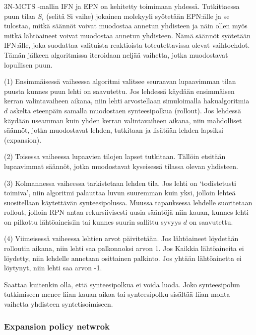 \documentclass[finnish,twoside,censored,tkt,sw-line]{HYthesisML}
\begin{document}
3N-MCTS -mallin IFN ja EPN on kehitetty toimimaan yhdessä.
Tutkittaessa puun tilaa \(S_i\) (selitä Si vaihe) jokainen molekyyli syötetään EPN:älle ja se tulostaa, mitkä säännöt voivat muodostaa annetun yhdisteen ja näin ollen myös mitkä lähtöaineet voivat muodostaa annetun yhdisteen.
Nämä säännöt syötetään IFN:älle, joka suodattaa valituista reaktioista toteutettavissa olevat vaihtoehdot.
Tämän jälkeen algoritmissa iteroidaan neljää vaihetta, jotka muodostavat lopullisen puun.

(1) Ensimmäisessä vaiheessa algoritmi valitsee seuraavan lupaavimman tilan puusta kunnes puun lehti on saavutettu.
Jos lehdessä käydään ensimmäisen kerran valintavaiheen aikana, niin lehti arvostellaan simuloimalla hakualgoritmia \(d\) askelta eteenpäin samalla muodostaen synteesipolkua (rollout).
Jos lehdessä käydään useamman kuin yhden kerran valintavaiheen aikana, niin mahdolliset säännöt, jotka muodostavat lehden, tutkitaan ja lisätään lehden lapsiksi (expansion).

(2) Toisessa vaiheessa lupaavien tilojen lapset tutkitaan.
Tällöin etsitään lupaavimmat säännöt, jotka muodostavat kyseisessä tilassa olevan yhdisteen.

(3) Kolmannessa vaiheessa tarkistetaan lehden tila.
Jos lehti on `todistetusti toimiva', niin algoritmi palauttaa luvun suuremman kuin yksi, jolloin lehteä suositellaan käytettävän synteesipolussa.
Muussa tapauksessa lehdelle suoritetaan rollout, jolloin RPN antaa rekursiivisesti uusia sääntöjä niin kauan, kunnes lehti on pilkottu lähtöaineisiin tai kunnes suurin sallittu syvyys \(d\) on saavutettu.

(4) Viimeisessä vaiheessa lehtien arvot päivitetään.
Jos lähtöaineet löydetään rolloutin aikana, niin lehti saa palkonnoksi arvon 1.
Jos Kaikkia lähtöaineita ei löydetty, niin lehdelle annetaan osittainen palkinto.
Jos yhtään lähtöainetta ei löytynyt, niin lehti saa arvon -1.

Saattaa kuitenkin olla, että synteesipolkua ei voida luoda.
Joko synteesipolun tutkimiseen menee liian kauan aikaa tai synteesipolku sisältää liian monta vaihetta yhdisteen syntetisoimiseen.


\subsubsection{Expansion policy netwrok}
\end{document}
